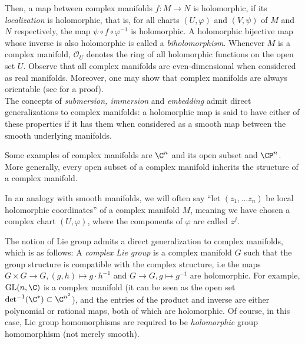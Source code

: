 Then, a map between complex manifolds \(f\colon M \to N\) is holomorphic, if its \textit{localization} is holomorphic, that is, for all charts \((U, \varphi)\) and \((V, \psi)\) of \(M\) and \(N\) respectively, the map \(\psi \circ f \circ \varphi^{-1}\) is holomorphic. A holomorphic bijective map whose inverse is also holomorphic is called a \textit{biholomorphism}. Whenever \(M\) is a complex manifold, \(\mathcal{O}_U\) denotes the ring of all holomorphic functions on the open set \(U\). Observe that all complex manifolds are even-dimensional when considered as real manifolds. Moreover, one may show that complex manifolds are always orientable (see \parencite[Prop. 1.49]{lee_introCM} for a proof). \\

The concepts of \textit{submersion, immersion} and \textit{embedding} admit direct generalizations to complex manifolds: a holomorphic map is said to have either of these properties if it has them when considered as a smooth map between the smooth underlying manifolds.

\begin{example}
    Some examples of complex manifolds are \(\C^n\) and its open subset and \(\CP^n\). More generally, every open subset of a complex manifold inherits the structure of a complex manifold.
\end{example}
In an analogy with smooth manifolds, we will often say ``let \((z_1, \ldots z_n)\) be local holomorphic coordinates'' of a complex manifold \(M\), meaning we have chosen a complex chart \((U, \varphi)\), where the components of \(\varphi\) are called \(z^j\).

\begin{obs}
    The notion of Lie group admits a direct generalization to complex manifolds, which is as follows: A \textit{complex Lie group} is a complex manifold \(G\) such that the group structure is compatible with the complex structure, i.e the maps \(G\times G \to G, (g,h) \mapsto g \cdot h^{-1}\) and \(G \to G, g \mapsto g^{-1}\) are holomorphic. For example, \(\mathrm{GL}(n,\C)\) is a complex manifold (it can be seen as the open set \(\det^{-1}(\C^*) \subset \C^{n^2}\)), and the entries of the product and inverse are either polynomial or rational maps, both of which are holomorphic. Of course, in this case, Lie group homomorphisms are required to be \textit{holomorphic} group homomorphism (not merely smooth).
\end{obs}
